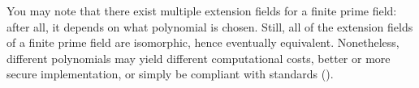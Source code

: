You may note that there exist multiple extension fields for a finite prime field: after all, it depends on what polynomial is chosen. Still, all of the extension fields of a finite prime field are isomorphic, hence eventually equivalent. Nonetheless, different polynomials may yield different computational costs, better or more secure implementation, or simply be compliant with standards ().
